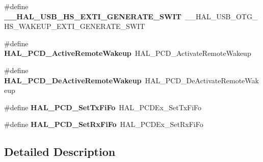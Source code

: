\begin{DoxyCompactItemize}
\#define {\bfseries \+\_\+\+\_\+\+H\+A\+L\+\_\+\+U\+S\+B\+\_\+\+H\+S\+\_\+\+E\+X\+T\+I\+\_\+\+G\+E\+N\+E\+R\+A\+T\+E\+\_\+\+S\+W\+IT}~\+\_\+\+\_\+\+H\+A\+L\+\_\+\+U\+S\+B\+\_\+\+O\+T\+G\+\_\+\+H\+S\+\_\+\+W\+A\+K\+E\+U\+P\+\_\+\+E\+X\+T\+I\+\_\+\+G\+E\+N\+E\+R\+A\+T\+E\+\_\+\+S\+W\+IT
\item 
\mbox{\label{group___h_a_l___u_s_b___aliased___macros_gaf7a3fc7d87b9ef4947082e8bba921480}} 
\#define {\bfseries H\+A\+L\+\_\+\+P\+C\+D\+\_\+\+Active\+Remote\+Wakeup}~H\+A\+L\+\_\+\+P\+C\+D\+\_\+\+Activate\+Remote\+Wakeup
\item 
\mbox{\label{group___h_a_l___u_s_b___aliased___macros_ga3aa67b4ed925bf6e4f9f22054037e243}} 
\#define {\bfseries H\+A\+L\+\_\+\+P\+C\+D\+\_\+\+De\+Active\+Remote\+Wakeup}~H\+A\+L\+\_\+\+P\+C\+D\+\_\+\+De\+Activate\+Remote\+Wakeup
\item 
\mbox{\label{group___h_a_l___u_s_b___aliased___macros_ga7583d6ad8bc46cf004c4e7d4d75a29a4}} 
\#define {\bfseries H\+A\+L\+\_\+\+P\+C\+D\+\_\+\+Set\+Tx\+Fi\+Fo}~H\+A\+L\+\_\+\+P\+C\+D\+Ex\+\_\+\+Set\+Tx\+Fi\+Fo
\item 
\mbox{\label{group___h_a_l___u_s_b___aliased___macros_gaa57fb6445f12a2e697a1f61e0b748c4b}} 
\#define {\bfseries H\+A\+L\+\_\+\+P\+C\+D\+\_\+\+Set\+Rx\+Fi\+Fo}~H\+A\+L\+\_\+\+P\+C\+D\+Ex\+\_\+\+Set\+Rx\+Fi\+Fo
\end{DoxyCompactItemize}


\subsection{Detailed Description}

